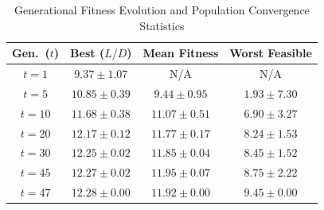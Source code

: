 \begin{table}[t]
\centering
\caption{Generational Fitness Evolution and Population Convergence Statistics}
\label{tab:fitness_evolution}
\small
\begin{tabular}{cccc}
\hline
\textbf{Gen.\ ($t$)} &
\textbf{Best ($L/D$)} &
\textbf{Mean Fitness} &
\textbf{Worst Feasible} \\
\hline
$t = 1$  & $9.37  \pm 1.07$ & N/A              & N/A \\
$t = 5$  & $10.85 \pm 0.39$ & $9.44  \pm 0.95$ & $1.93 \pm 7.30$ \\
$t = 10$ & $11.68 \pm 0.38$ & $11.07 \pm 0.51$ & $6.90 \pm 3.27$ \\
$t = 20$ & $12.17 \pm 0.12$ & $11.77 \pm 0.17$ & $8.24 \pm 1.53$ \\
$t = 30$ & $12.25 \pm 0.02$ & $11.85 \pm 0.04$ & $8.45 \pm 1.52$ \\
$t = 45$ & $12.27 \pm 0.02$ & $11.95 \pm 0.07$ & $8.75 \pm 2.22$ \\
$t = 47$ & $12.28 \pm 0.00$ & $11.92 \pm 0.00$ & $9.45 \pm 0.00$ \\
\hline
\end{tabular}
\normalsize
\end{table}
